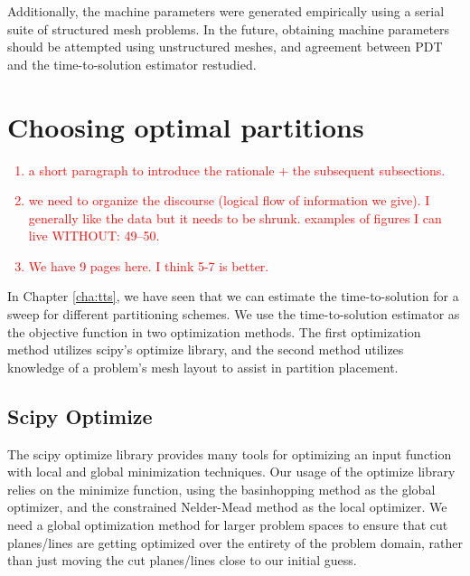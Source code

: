 \documentclass[times,final]{elsarticle}
\newcommand{\tcr}[1]{\textcolor{red}{#1}}
\begin{document}
Additionally, the machine parameters were generated empirically using a serial suite of structured mesh problems.
In the future, obtaining machine parameters should be attempted using unstructured meshes, and agreement between PDT and the time-to-solution estimator restudied.

\section{Choosing optimal partitions}\label{cha:optimization}
\tcr{
\begin{enumerate}
\item a short paragraph to introduce the rationale + the subsequent subsections.
\item we need to organize the discourse (logical flow of information we give). I generally like the data but it needs to be shrunk. examples of figures I can live WITHOUT: 49--50.
\item We have 9 pages here. I think 5-7 is better.
\end{enumerate}
}
In Chapter \ref{cha:tts}, we have seen that we can estimate the time-to-solution for a sweep for different partitioning schemes.
We use the time-to-solution estimator as the objective function in two optimization methods.
The first optimization method utilizes scipy's optimize library, and the second method utilizes knowledge of a problem's mesh layout to assist in partition placement.

\subsection{Scipy Optimize}
The scipy optimize library \cite{scipy} provides many tools for optimizing an input function with local and global minimization techniques.
Our usage of the optimize library relies on the minimize function, using the basinhopping \cite{basinhoppingwales} method as the global optimizer, and the constrained Nelder-Mead method as the local optimizer.
We need a global optimization method for larger problem spaces to ensure that cut planes/lines are getting optimized over the entirety of the problem domain, rather than just moving the cut planes/lines close to our initial guess.
\end{document}
